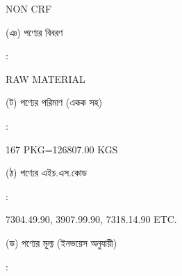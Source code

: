 \documentclass[12pt]{article}
\newcommand{\good}{RAW MATERIAL}
\newcommand{\pkg}{167 PKG=126807.00 KGS}
\newcommand{\crf}{NON CRF}
\newcommand{\crfdt}{}
\newcommand{\hscode}{7304.49.90, 3907.99.90, 7318.14.90 ETC.}
\begin{document}
\begin{minipage}[t]{0.50\linewidth}
{\crf} \hspace{2em} {\crfdt}
\\
\end{minipage}
\begin{minipage}[t]{0.05\linewidth}
\hspace*{1em}
\end{minipage}
\begin{minipage}[t]{0.45\linewidth}
(ঞ) পণ্যের বিবরণ
\end{minipage}
\begin{minipage}[t]{0.02\linewidth}
:
\end{minipage}
\begin{minipage}[t]{0.50\linewidth}
{\good}
\\
\end{minipage}
\begin{minipage}[t]{0.05\linewidth}
\hspace*{1em}
\end{minipage}
\begin{minipage}[t]{0.45\linewidth}
(ট) পণ্যের পরিমাণ (একক সহ)
\end{minipage}
\begin{minipage}[t]{0.02\linewidth}
:
\end{minipage}
\begin{minipage}[t]{0.50\linewidth}
{\pkg}
\\
\end{minipage}
\begin{minipage}[t]{0.05\linewidth}
\hspace*{1em}
\end{minipage}
\begin{minipage}[t]{0.45\linewidth}
(ঠ) পণ্যের এইচ.এস.কোড
\end{minipage}
\begin{minipage}[t]{0.02\linewidth}
:
\end{minipage}
\begin{minipage}[t]{0.50\linewidth}
{\hscode}
\\
\end{minipage}
\begin{minipage}[t]{0.05\linewidth}
\hspace*{1em}
\end{minipage}
\begin{minipage}[t]{0.45\linewidth}
(ড) পণ্যের মূল্য (ইনভয়েস অনুযায়ী)
\end{minipage}
\begin{minipage}[t]{0.02\linewidth}
:
\end{minipage}
\end{document}
